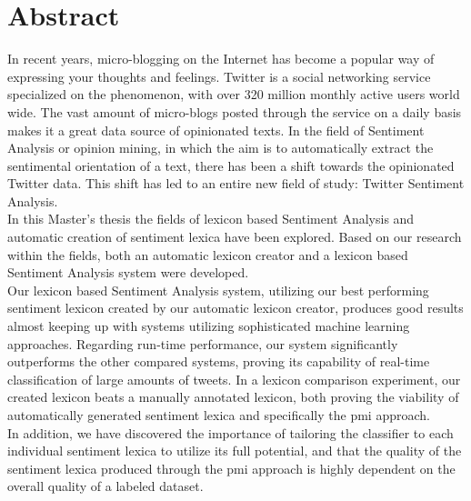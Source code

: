 \section*{Abstract}
In recent years, micro-blogging on the Internet has become a popular way of expressing your thoughts and feelings. Twitter is a social networking service specialized on the phenomenon, with over 320 million monthly active users world wide. The vast amount of micro-blogs posted through the service on a daily basis makes it a great data source of opinionated texts. In the field of Sentiment Analysis or opinion mining, in which the aim is to automatically extract the sentimental orientation of a text, there has been a shift towards the opinionated Twitter data. This shift has led to an entire new field of study: Twitter Sentiment Analysis. \\

In this Master's thesis the fields of lexicon based Sentiment Analysis and automatic creation of sentiment lexica have been explored. Based on our research within the fields, both an automatic lexicon creator and a lexicon based Sentiment Analysis system were developed. \\

Our lexicon based Sentiment Analysis system, utilizing our best performing sentiment lexicon created by our automatic lexicon creator, produces good results almost keeping up with systems utilizing sophisticated machine learning approaches. Regarding run-time performance, our system significantly outperforms the other compared systems, proving its capability of real-time classification of large amounts of tweets. In a lexicon comparison experiment, our created lexicon beats a manually annotated lexicon, both proving the viability of automatically generated sentiment lexica and specifically the \ac{pmi} approach. \\

In addition, we have discovered the importance of tailoring the classifier to each individual sentiment lexica to utilize its full potential, and that the quality of the sentiment lexica produced through the \ac{pmi} approach is highly dependent on the overall quality of a labeled dataset.

\glsresetall